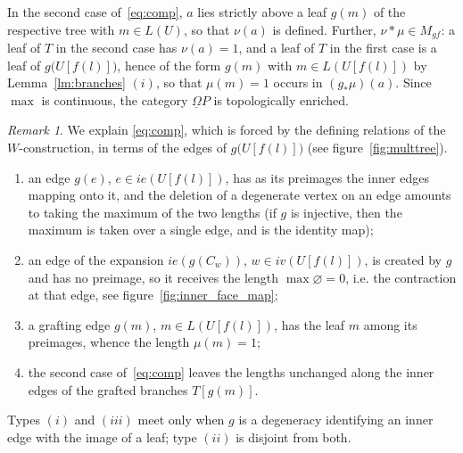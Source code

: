 \documentclass{amsart}
\theoremstyle{definition}
\theoremstyle{remark}
\newtheorem{remark}[formula]{Remark}
\begin{document}
	In the second case of~\eqref{eq:comp}, $a$ lies strictly above a leaf $g(m)$ of the respective tree with $m\in L(U)$, so that $\nu(a)$ is defined. 
	Further, $\nu*\mu\in M_{gf}$: a leaf of $T$ in the second case has $\nu(a)=1$, and a leaf of $T$ in the first case is a leaf of $g\bigl(U[f(l)])$, hence of the form $g(m)$ with $m\in L(U[f(l)])$ by Lemma~\ref{lm:branches} $(i)$, so that $\mu(m)=1$ occurs in $(g_*\mu)(a)$. 
	Since $\max$ is continuous, the
	category $\underline{\Omega} P$ is topologically enriched.
	
	\begin{remark}\label{rem:types}
		We explain \eqref{eq:comp}, which is forced by the defining relations of the $W$-construction, in
		terms of the edges of $g\bigl(U[f(l)])$ (see figure~\ref{fig:multtree}).
		\begin{enumerate}[label=(\roman*)]
			\item an edge $g(e)$, $e\in ie(U[f(l)])$, has as its preimages the inner edges mapping
			onto it, and the deletion of a degenerate vertex on an edge amounts to taking the maximum of the two
			lengths
			(if $g$ is injective, then the maximum is taken over a single edge, and is the identity map);
			\item an edge of the expansion $ie(g(C_w))$, $w\in iv(U[f(l)])$, is created by
			$g$ and has no preimage, so it receives the length $\max\varnothing=0$, i.e. the contraction at that
			edge, see figure~\ref{fig:inner_face_map};
			\item a grafting edge $g(m)$, $m\in L(U[f(l)])$, has the leaf $m$ among its preimages, whence
			the length $\mu(m)=1$; 
			\item the second case of~\eqref{eq:comp} leaves the lengths unchanged along the inner edges of
			the grafted branches $T[g(m)]$.
		\end{enumerate}
		Types $(i)$ and $(iii)$ meet only when $g$ is a degeneracy identifying an inner edge with the image of a
		leaf; type $(ii)$ is disjoint from both.
	\end{remark}
\end{document}
